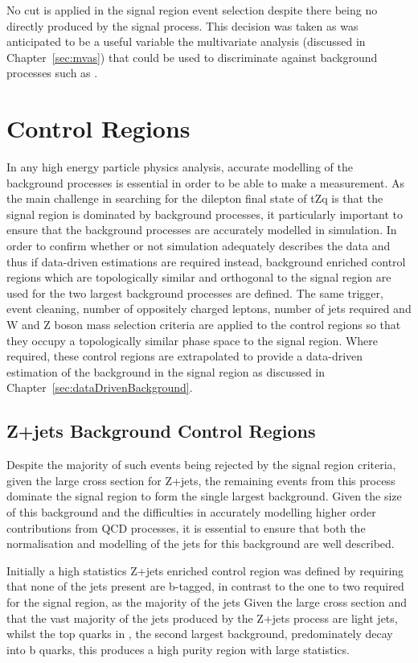 No \MET cut is applied in the signal region event selection despite there being no \MET directly produced by the signal process.
This decision was taken as \MET was anticipated to be a useful variable the multivariate analysis (discussed in Chapter~\ref{sec:mvas}) that could be used to discriminate against background processes such as \ttbar.

\section{Control Regions}\label{sec:controlRegions}
In any high energy particle physics analysis, accurate modelling of the background processes is essential in order to be able to make a measurement.
As the main challenge in searching for the dilepton final state of tZq is that the signal region is dominated by background processes, it particularly important to ensure that the background processes are accurately modelled in simulation.
In order to confirm whether or not simulation adequately describes the data and thus if data-driven estimations are required instead, background enriched control regions which are topologically similar and orthogonal to the signal region are used for the two largest background processes are defined.
The same trigger, event cleaning, number of oppositely charged leptons, number of jets required and W and Z boson mass selection criteria are applied to the control regions so that they occupy a topologically similar phase space to the signal region.
Where required, these control regions are extrapolated to provide a data-driven estimation of the background in the signal region as discussed in Chapter~\ref{sec:dataDrivenBackground}.

\subsection{Z+jets Background Control Regions}\label{subsec:zPlusJetsCR}
Despite the majority of such events being rejected by the signal region criteria, given the large cross section for Z+jets, the remaining events from this process dominate the signal region to form the single largest background.
Given the size of this background and the difficulties in accurately modelling higher order contributions from QCD processes, it is essential to ensure that both the normalisation and modelling of the jets for this background are well described.

Initially a high statistics Z+jets enriched control region was defined by requiring that none of the jets present are b-tagged, in contrast to the one to two required for the signal region, as the majority of the jets 
Given the large cross section and that the vast majority of the jets produced by the Z+jets process are light jets, whilst the top quarks in \ttbar, the second largest background, predominately decay into b quarks, this produces a high purity region with large statistics.

